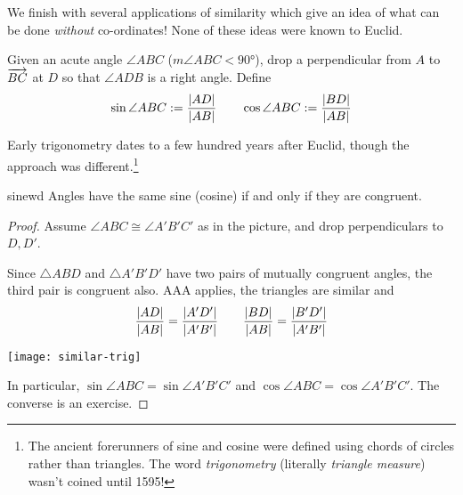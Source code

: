 


\goodbreak




We finish with several applications of similarity which give an idea of what can be done \emph{without} co-ordinates! None of these ideas were known to Euclid.

\begin{defn}{}{}
Given an acute angle $\angle ABC$ ($m\angle ABC<\ang{90}$), drop a perpendicular from $A$ to $\overrightarrow{BC}$ at $D$ so that $\angle ADB$ is a right angle. Define
\[\sin\angle ABC:=\frac{\left| AD\right|}{\left| AB\right|}\qquad \cos\angle ABC:=\frac{\left| BD\right|}{\left| AB\right|}\]
\end{defn}

Early trigonometry dates to a few hundred years after Euclid, though the approach was different.\footnote{The ancient forerunners of sine and cosine were defined using chords of circles rather than triangles. The word \emph{trigonometry} (literally \emph{triangle measure}) wasn't coined until 1595!}


\begin{thm}{}{sinewd}
Angles have the same sine (cosine) if and only if they are congruent.
\end{thm}


\begin{proof}
Assume $\angle ABC\cong\angle A'B'C'$ as in the picture, and drop perpendiculars to $D,D'$.\par
\begin{minipage}[t]{0.56\linewidth}\vspace{-8pt}
Since $\triangle ABD$ and $\triangle A'B'D'$ have two pairs of mutually congruent angles, the third pair is congruent also. AAA applies, the triangles are similar and
\[\frac{\left| AD\right|}{\left| AB\right|}=\frac{\left| A'D'\right|}{\left| A'B'\right|}\qquad \frac{\left| BD\right|}{\left| AB\right|}=\frac{\left| B'D'\right|}{\left| A'B'\right|}\]
\end{minipage}\hfill\begin{minipage}[t]{0.43\linewidth}\vspace{-8pt}
\flushright\texttt{[image: similar-trig]}
\end{minipage}\smallbreak
In particular, $\sin\angle ABC=\sin\angle A'B'C'$ and $\cos\angle ABC=\cos\angle A'B'C'$.\smallbreak
The converse is an exercise.
\end{proof}


